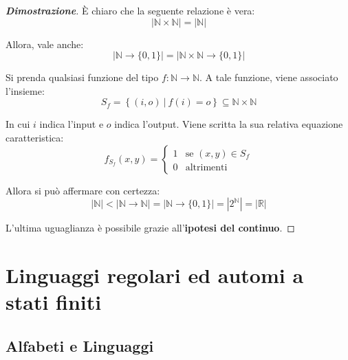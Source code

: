 \documentclass[a4paper]{article}
\begin{document}
	\begin{proof}[\textbf{Dimostrazione}]
		È chiaro che la seguente relazione è vera:
		\begin{equation*}
			|\mathbb{N} \times \mathbb{N}| = |\mathbb{N}|
		\end{equation*}
	
		\noindent
		Allora, vale anche:
		\begin{equation*}
			|\mathbb{N}\longrightarrow\{0,1\}| = |\mathbb{N}\times\mathbb{N}\longrightarrow\{0,1\}|
		\end{equation*}
		
		\noindent
		Si prenda qualsiasi funzione del tipo $f: \mathbb{N} \longrightarrow \mathbb{N}$. A tale funzione, viene associato l'insieme:
		\begin{equation*}
			S_{f} = \left\{
			(i, o)\: | \: f(i) = o
			\right\} \subseteq \mathbb{N} \times \mathbb{N}
		\end{equation*}
		
		\noindent
		In cui $i$ indica l'input e $o$ indica l'output. Viene scritta la sua relativa equazione caratteristica:
		\begin{equation*}
			f_{S_{f}} (x,y) =
			\begin{cases}
				1 & \text{se } (x,y) \in S_{f} \\
				0 & \text{altrimenti}
			\end{cases}
		\end{equation*}
	
		\noindent
		Allora si può affermare con certezza:
		\begin{equation}\label{uguaglianza_problema_decisionale}
			|\mathbb{N}| < |\mathbb{N} \longrightarrow \mathbb{N}| = |\mathbb{N} \longrightarrow \{0,1\}| = |2^{\mathbb{N}}| = |\mathbb{R}|
		\end{equation}
	
		\noindent
		L'ultima uguaglianza è possibile grazie all'\textbf{ipotesi del continuo}.
	\end{proof}

	\newpage
	
	
	
	
	\section{Linguaggi regolari ed automi a stati finiti}
	
	\subsection{Alfabeti e Linguaggi}
	
\end{document}
